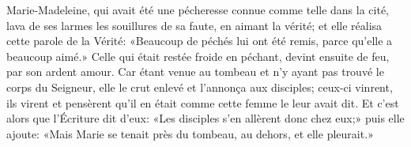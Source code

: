 Marie-Madeleine, qui avait été une pécheresse connue comme telle dans la cité,
	lava de ses larmes les souillures de sa faute,
	en aimant la vérité;
	et elle réalisa cette parole de la Vérité:
	«Beaucoup de péchés lui ont été remis, parce qu’elle a beaucoup aimé.»
Celle qui était restée froide en péchant,
	devint ensuite de feu, par son ardent amour.
Car étant venue au tombeau et n’y ayant pas trouvé le corps du Seigneur,
	elle le crut enlevé et l’annonça aux disciples;
	ceux-ci vinrent, ils virent
		et pensèrent qu’il en était comme cette femme le leur avait dit.
Et c’est alors que l’Écriture dit d’eux:
	«Les disciples s’en allèrent donc chez eux;»
	puis elle ajoute:
	«Mais Marie se tenait près du tombeau, au dehors, et elle pleurait.»
